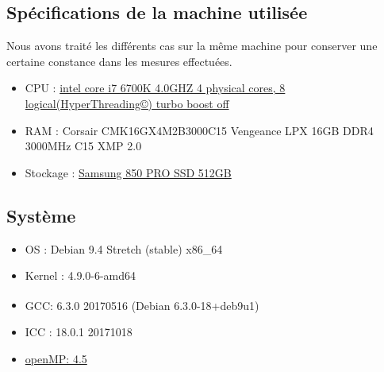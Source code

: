 \documentclass{report}
\begin{document}
  \subsection{Spécifications de la machine utilisée}
  Nous avons traité les différents cas sur la même machine pour conserver une certaine constance dans les mesures effectuées.
    \begin{itemize}
      \item CPU : \href{https://ark.intel.com/products/88195/Intel-Core-i7-6700K-Processor-8M-Cache-up-to-4_20-GHz}
        {intel core i7 6700K 4.0GHZ 4 physical cores, 8 logical(HyperThreading©) turbo boost off}
      \item RAM : Corsair CMK16GX4M2B3000C15 Vengeance LPX 16GB DDR4 3000MHz C15 XMP 2.0
      \item Stockage : \href{http://downloadcenter.samsung.com/content/UM/201711/20171115103115156/Samsung_SSD_850_PRO_Data_Sheet_Rev_3.pdf}
          {Samsung 850 PRO SSD 512GB}
    \end{itemize}
    \subsection{Système}
      \begin{itemize}
      \item OS : Debian 9.4 Stretch (stable) x86\_64
      \item Kernel :  4.9.0-6-amd64
      \item GCC\textsuperscript \textcopyleft   : 6.3.0 20170516 (Debian 6.3.0-18+deb9u1)
      \item ICC : 18.0.1 20171018
      \item \href{http://www.openmp.org/wp-content/uploads/openmp-4.5.pdf}{openMP: 4.5}
    \end{itemize}
\end{document}
